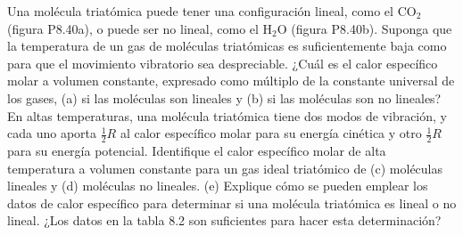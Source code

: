 \item Una molécula triatómica puede tener una configuración lineal, como el $\text{CO}_2$ (figura P8.40a), o puede ser no lineal, como el $\text{H}_2\text{O}$ (figura P8.40b). Suponga que la temperatura de un gas de moléculas triatómicas es suficientemente baja como para que el movimiento vibratorio sea despreciable. ¿Cuál es el calor específico molar a volumen constante, expresado como múltiplo de la constante universal de los gases, (a) si las moléculas son lineales y (b) si las moléculas son no lineales? En altas temperaturas, una molécula triatómica tiene dos modos de vibración, y cada uno aporta $\frac{1}{2}R$ al calor específico molar para su energía cinética y otro $\frac{1}{2}R$ para su energía potencial. Identifique el calor específico molar de alta temperatura a volumen constante para un gas ideal triatómico de (c) moléculas lineales y (d) moléculas no lineales. (e) Explique cómo se pueden emplear los datos de calor específico para determinar si una molécula triatómica es lineal o no lineal. ¿Los datos en la tabla 8.2 son suficientes para hacer esta determinación?
